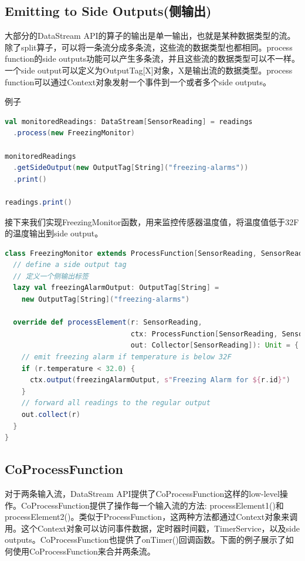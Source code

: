 \documentclass[oneside]{ctexbook}
\begin{document}
\subsection{Emitting to Side Outputs(侧输出)}

大部分的DataStream API的算子的输出是单一输出，也就是某种数据类型的流。除了split算子，可以将一条流分成多条流，这些流的数据类型也都相同。process function的side outputs功能可以产生多条流，并且这些流的数据类型可以不一样。一个side output可以定义为OutputTag[X]对象，X是输出流的数据类型。process function可以通过Context对象发射一个事件到一个或者多个side outputs。

例子

\begin{lstlisting}[language=scala]
val monitoredReadings: DataStream[SensorReading] = readings
  .process(new FreezingMonitor)

monitoredReadings
  .getSideOutput(new OutputTag[String]("freezing-alarms"))
  .print()

readings.print()
\end{lstlisting}

接下来我们实现FreezingMonitor函数，用来监控传感器温度值，将温度值低于32F的温度输出到side output。

\begin{lstlisting}[language=scala]
class FreezingMonitor extends ProcessFunction[SensorReading, SensorReading] {
  // define a side output tag
  // 定义一个侧输出标签
  lazy val freezingAlarmOutput: OutputTag[String] =
    new OutputTag[String]("freezing-alarms")

  override def processElement(r: SensorReading,
                              ctx: ProcessFunction[SensorReading, SensorReading]#Context,
                              out: Collector[SensorReading]): Unit = {
    // emit freezing alarm if temperature is below 32F
    if (r.temperature < 32.0) {
      ctx.output(freezingAlarmOutput, s"Freezing Alarm for ${r.id}")
    }
    // forward all readings to the regular output
    out.collect(r)
  }
}
\end{lstlisting}

\subsection{CoProcessFunction}

对于两条输入流，DataStream API提供了CoProcessFunction这样的low-level操作。CoProcessFunction提供了操作每一个输入流的方法: processElement1()和processElement2()。类似于ProcessFunction，这两种方法都通过Context对象来调用。这个Context对象可以访问事件数据，定时器时间戳，TimerService，以及side outputs。CoProcessFunction也提供了onTimer()回调函数。下面的例子展示了如何使用CoProcessFunction来合并两条流。
\end{document}
